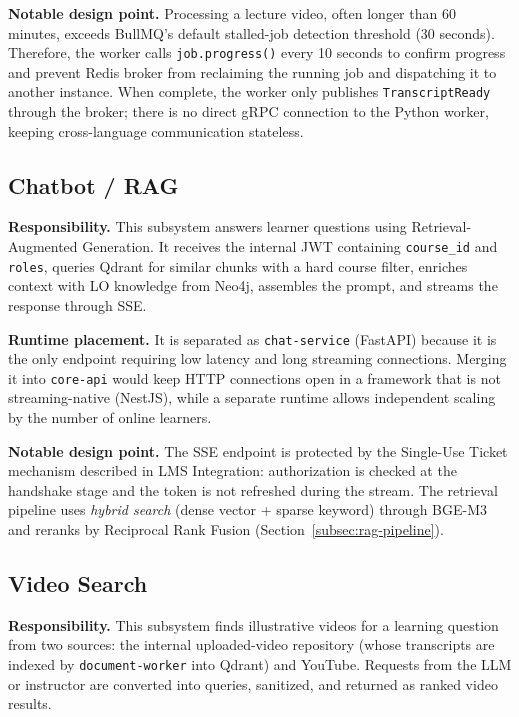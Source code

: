 \textbf{Notable design point.} Processing a lecture video, often longer
than 60 minutes, exceeds BullMQ's default stalled-job detection threshold
(30 seconds). Therefore, the worker calls \texttt{job.progress()} every
10 seconds to confirm progress and prevent Redis broker from reclaiming
the running job and dispatching it to another instance. When complete,
the worker only publishes \texttt{TranscriptReady} through the broker;
there is no direct gRPC connection to the Python worker, keeping
cross-language communication stateless.

\subsection{Chatbot / RAG}

\textbf{Responsibility.} This subsystem answers learner questions using
Retrieval-Augmented Generation. It receives the internal JWT containing
\texttt{course\_id} and \texttt{roles}, queries Qdrant for similar chunks
with a hard course filter, enriches context with LO knowledge from Neo4j,
assembles the prompt, and streams the response through SSE.

\textbf{Runtime placement.} It is separated as \texttt{chat-service}
(FastAPI) because it is the only endpoint requiring low latency and long
streaming connections. Merging it into \texttt{core-api} would keep HTTP
connections open in a framework that is not streaming-native (NestJS),
while a separate runtime allows independent scaling by the number of
online learners.

\textbf{Notable design point.} The SSE endpoint is protected by the
Single-Use Ticket mechanism described in LMS Integration: authorization is
checked at the handshake stage and the token is not refreshed during the
stream. The retrieval pipeline uses \emph{hybrid search} (dense vector +
sparse keyword) through BGE-M3 and reranks by Reciprocal Rank Fusion
(Section~\ref{subsec:rag-pipeline}).

\subsection{Video Search}
\label{subsec:video-search-service}

\textbf{Responsibility.} This subsystem finds illustrative videos for a
learning question from two sources: the internal uploaded-video repository
(whose transcripts are indexed by \texttt{document-worker} into Qdrant)
and YouTube. Requests from the LLM or instructor are converted into
queries, sanitized, and returned as ranked video results.

